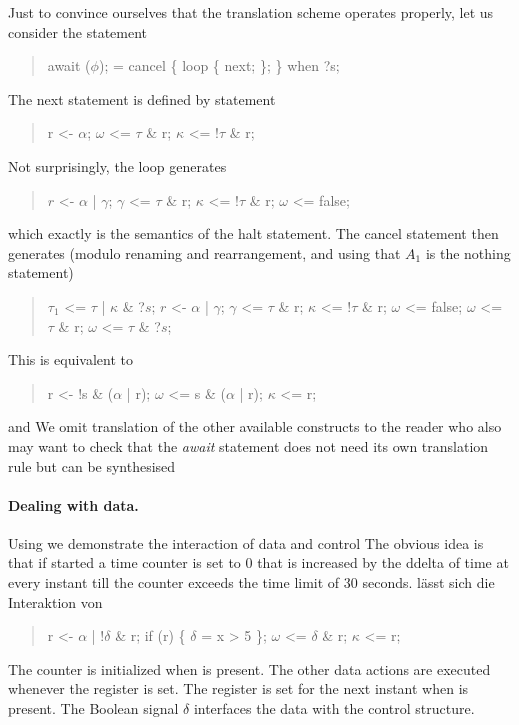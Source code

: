 Just to convince ourselves that the translation scheme operates properly, let us consider the statement
\begin{quote}
\BEP
     await ($\phi$); = cancel \{
                       loop \{
                          next;
                       \};
                   \} when ?s;
\EEP
\end{quote}
The next statement is defined by 
 statement
\begin{quote}
\BEP
    r <- $\alpha$; 
    $\omega$ <= $\tau$ \& r;
    $\kappa$ <= !$\tau$ \& r;
\EEP
\end{quote}
Not surprisingly, the loop generates
\begin{quote}
\BEP
    $r$ <- $\alpha$ | $\gamma$;
    $\gamma$ <= $\tau$ \& r;
    $\kappa$ <= !$\tau$ \& r;
    $\omega$ <= false;
\EEP
\end{quote}
which exactly is the semantics of the halt statement. The cancel statement then generates (modulo renaming and rearrangement, and using that $A_{1}$ is the nothing statement)
\begin{quote}
\BEP
    $\tau_{1}$ <= $\tau$ | $\kappa$ \& ?$s$;
    $r$ <- $\alpha$ | $\gamma$;
    $\gamma$ <= $\tau$ \& r;
    $\kappa$ <= !$\tau$ \& r;
    $\omega$ <= false;
     $\omega$ <= $\tau$ \& r;
    $\omega$ <= $\tau$ \& ?$s$;
\EEP
\end{quote}
This is equivalent to 
\begin{quote} 
\BEP
    r <- !s \& ($\alpha$ | r);
    $\omega$ <=  s \& ($\alpha$ | r);
    $\kappa$ <= r;
\EEP
\end{quote}


and 
We omit translation of the other available constructs to the reader who also
may want to check that the \emph{await} statement does not need its own translation rule but can be synthesised 

\paragraph{Dealing with data.}

Using  we demonstrate the interaction of data and control
The obvious idea is that if started a time counter is set to 0 that is
increased by the ddelta of time  at every instant till the counter exceeds the time limit of 30 seconds.
l\"{a}sst sich die Interaktion von
\begin{quote}
\BEP
    r <- $\alpha$ | !$\delta$ \& r; 
    if (r) \{ $\delta$ = x > 5 \};
    $\omega$ <= $\delta$ \& r;
    $\kappa$ <= r;
\EEP
\end{quote}
The counter is initialized when  is present.
The other data actions are executed whenever the register  is set. The register is set for the next instant when  is present. The Boolean signal $\delta$ interfaces the data with the control structure.

